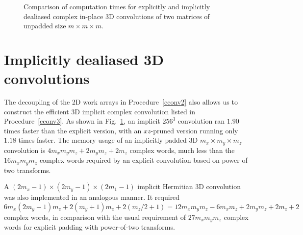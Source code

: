 \documentclass[final]{siamltex}
\begin{document}
\begin{figure}[htbp]
\begin{minipage}{0.5\linewidth}
\begin{center}
\caption{Comparison of computation times for explicitly and implicitly
dealiased complex in-place 3D convolutions of two matrices of
unpadded size $m\times m\times m$.}
\label{timing3c}
\end{center}
\end{minipage}
%
\end{figure}


\section{Implicitly dealiased 3D convolutions}\label{3d}

The decoupling of the 2D work arrays in Procedure~\ref{cconv2}
also allows us to construct the efficient 3D implicit complex convolution
listed in Procedure~\ref{cconv3}. As shown in Fig.~\ref{timing3c}, an implicit
$256^3$ convolution ran $1.90$ times faster than the explicit version, with
an $xz$-pruned version running only $1.18$ times faster. The memory usage of an
implicitly padded 3D $m_x\times m_y\times m_z$ convolution is
$4m_xm_ym_z+2m_y m_z+2m_z$ complex words, much less than the
$16m_xm_ym_z$ complex words required by an explicit 
convolution based on power-of-two transforms.

A $(2m_x-1)\times (2m_y-1)\times (2m_1-1)$ implicit Hermitian 3D
convolution was also implemented in an analogous manner. It required
$$
6m_x(2m_y-1)m_z+2(m_y+1)m_z+2(m_z/2+1)=12m_xm_ym_z-6m_xm_z+2m_ym_z+2m_z+2
$$
complex words, in comparison with the usual requirement of $27m_xm_ym_z$
complex words for explicit padding with power-of-two transforms.

\begin{function}[htbp]
  \Return \xf\;
\caption{cconv3(matrix~{\sf f}, matrix~{\sf g}) 
returns an in-place implicitly dealiased convolution of
$m_x\times m_y\times m_z$ matrices {\sf f} and {\sf g} using temporary
$m_x\times m_y\times m_z$ matrices ${\sf U}$ and ${\sf V}$, 
$m_y\times m_z$ matrices ${\sf u}_2$ and ${\sf v}_2$,
and vectors ${\sf u}_1$ and ${\sf v}_1$ of length~$m_z$.}\label{cconv3}
\end{function}
\end{document}
